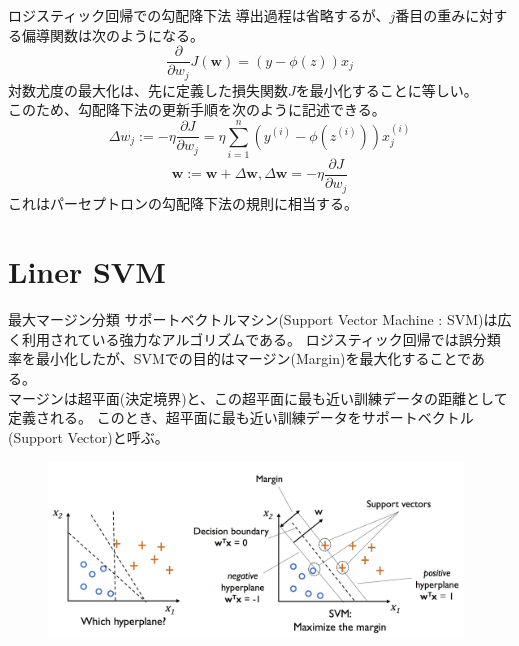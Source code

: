 \documentclass[aspectratio=169, dvipdfmx, 11pt]{beamer} %
\begin{document}
\begin{frame}{ロジスティック回帰での勾配降下法}
    導出過程は省略するが、\(j\)番目の重みに対する偏導関数は次のようになる。
    \begin{equation*}
        \frac{\partial}{\partial w_j}J(\bm{w}) = (y - \phi(z))x_j
    \end{equation*}
    対数尤度の最大化は、先に定義した損失関数\(J\)を最小化することに等しい。\\
    このため、勾配降下法の更新手順を次のように記述できる。
    \begin{equation*}
        \Delta w_j := - \eta \frac{\partial J}{\partial w_j} 
        = \eta \sum_{i=1}^{n} (y^{(i)} - \phi(z^{(i)}))x_{j}^{(i)}
    \end{equation*}
    \begin{equation*}
        \bm{w} := \bm{w} + \Delta \bm{w}, \Delta \bm{w} = - \eta \frac{\partial J}{\partial w_j} 
    \end{equation*}
    これはパーセプトロンの勾配降下法の規則に相当する。
\end{frame}

\section{Liner SVM}
\begin{frame}{最大マージン分類}
    サポートベクトルマシン(Support Vector Machine : SVM)は広く利用されている強力なアルゴリズムである。
    ロジスティック回帰では誤分類率を最小化したが、SVMでの目的はマージン(Margin)を最大化することである。\\
    マージンは超平面(決定境界)と、この超平面に最も近い訓練データの距離として定義される。
    このとき、超平面に最も近い訓練データをサポートベクトル(Support Vector)と呼ぶ。
    \begin{figure}[b]
        \begin{center}
        \includegraphics[width=110mm]{img/day02/fig05.png}
        \end{center}
    \end{figure}
\end{frame}
\end{document}
